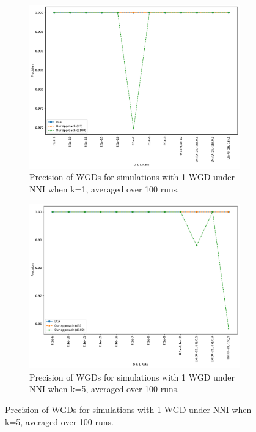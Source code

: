 \documentclass[10pt]{article}
\begin{document}
\begin{figure}[h!]
    \begin{subfigure}[b]{0.31\textwidth}
        \centering
        \includegraphics[width=\textwidth]{figs/precision-NNI-K1-WGD-t20-t80-Avg.pdf}
        \caption{Precision of WGDs for simulations with 1 WGD under NNI when k=1, averaged over 100 runs.}
        \label{fig:precision-NNI-k1-wgd}
    \end{subfigure}
    \hfill
    \begin{subfigure}[b]{0.31\textwidth}
        \centering
        \includegraphics[width=\textwidth]{figs/precision-NNI-K5-WGD-t20-t80-Avg.pdf}
        \caption{Precision of WGDs for simulations with 1 WGD under NNI when k=5, averaged over 100 runs.}

\end{subfigure}
\end{figure}
\end{document}
